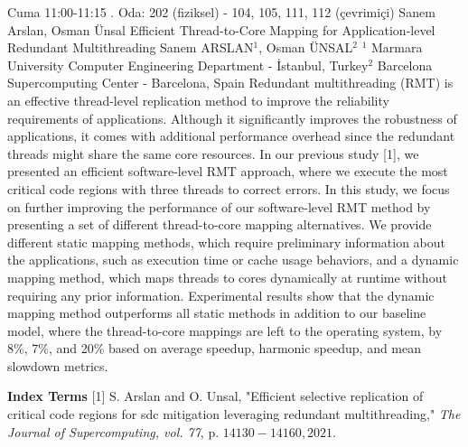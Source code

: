 
    \begin{abstract_basarim}
    {Cuma 11:00-11:15}
    {.}
    {Oda: 202 (fiziksel) - 104, 105, 111, 112 (çevrimiçi)}
    {Sanem Arslan, Osman Ünsal}
    {Efficient Thread-to-Core Mapping for Application-level Redundant Multithreading}
    {%
    Sanem ARSLAN$^{1}$, Osman ÜNSAL$^{2}$}
    {%
    }
    {%
    $^1$ Marmara University Computer Engineering Department - İstanbul, Turkey\newline{}$^2$ Barcelona Supercomputing Center - Barcelona, Spain}
    Redundant multithreading (RMT) is an effective thread-level replication method to improve the reliability requirements of applications. Although it significantly improves the robustness of applications, it comes with additional performance overhead since the redundant threads might share the same core resources. In our previous study [1], we presented an efficient software-level RMT approach, where we execute the most critical code regions with three threads to correct errors. In this study, we focus on further improving the performance of our software-level RMT method by presenting a set of different thread-to-core mapping alternatives. We provide different static mapping methods, which require preliminary information about the applications, such as execution time or cache usage behaviors, and a dynamic mapping method, which maps threads to cores dynamically at runtime without requiring any prior information. Experimental results show that the dynamic mapping method outperforms all static methods in addition to our baseline model, where the thread-to-core mappings are left to the operating system, by 8\%, 7\%, and 20\% based on average speedup, harmonic speedup, and mean slowdown metrics. 
    
            \textbf{Index Terms} \newline{}[1] S. Arslan and O. Unsal, "Efficient selective replication of critical code regions for sdc mitigation leveraging redundant multithreading," \textit{The Journal of Supercomputing, vol. 77}, p. $14130-14160,2021$.
    \end{abstract_basarim}
    